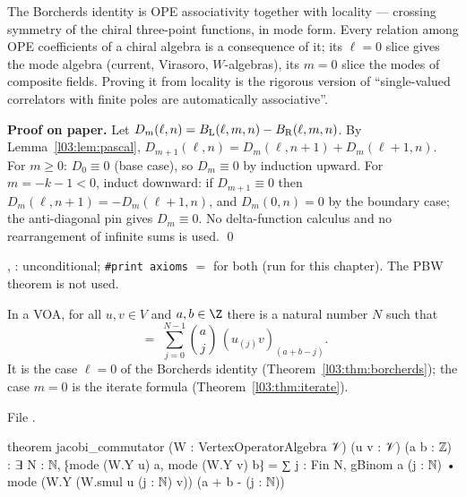 \begin{physics}
The Borcherds identity is OPE associativity together with locality --- crossing symmetry of the
chiral three-point functions, in mode form. Every relation among OPE coefficients of a chiral algebra
is a consequence of it; its $\ell = 0$ slice gives the mode algebra (current, Virasoro, $W$-algebras),
its $m = 0$ slice the modes of composite fields. Proving it from locality is the rigorous version of
``single-valued correlators with finite poles are automatically associative''.
\end{physics}

\textbf{Proof on paper.} Let $D_m(\ell,n) = B_{\mathrm L}(\ell,m,n) - B_{\mathrm R}(\ell,m,n)$. By
Lemma~\ref{l03:lem:pascal}, $D_{m+1}(\ell,n) = D_m(\ell,n+1) + D_m(\ell+1,n)$. For $m\ge0$: $D_0\equiv0$
(base case), so $D_m\equiv0$ by induction upward. For $m = -k-1<0$, induct downward: if $D_{m+1}\equiv0$
then $D_m(\ell,n+1) = -D_m(\ell+1,n)$, and $D_m(0,n) = 0$ by the boundary case; the anti-diagonal pin
gives $D_m\equiv0$. No delta-function calculus and no rearrangement of infinite sums is used. \qed

\begin{status}
, : unconditional; \texttt{\#print axioms} $=$
 for both (run for this chapter). The PBW theorem  is not used.
\end{status}

\begin{theorem}\label{l03:thm:jacobicomm}
In a VOA, for all $u,v\in V$ and $a,b\in\Z$ there is a natural number $N$ such that
\begin{equation*}
 [u_{(a)},v_{(b)}] \;=\; \sum_{j=0}^{N-1}\binom aj\,(u_{(j)}v)_{(a+b-j)} .
\end{equation*}
It is the case $\ell = 0$ of the Borcherds identity (Theorem~\ref{l03:thm:borcherds}); the case $m=0$ is the iterate
formula (Theorem~\ref{l03:thm:iterate}).
\end{theorem}
\noindent File .
\begin{leancode}
theorem jacobi_commutator (W : VertexOperatorAlgebra 𝒱) (u v : 𝒱) (a b : ℤ) :
    ∃ N : ℕ, ⁅mode (W.Y u) a, mode (W.Y v) b⁆
      = ∑ j : Fin N, gBinom a (j : ℕ) • mode (W.Y (W.smul u (j : ℕ) v)) (a + b - (j : ℕ))
\end{leancode}

